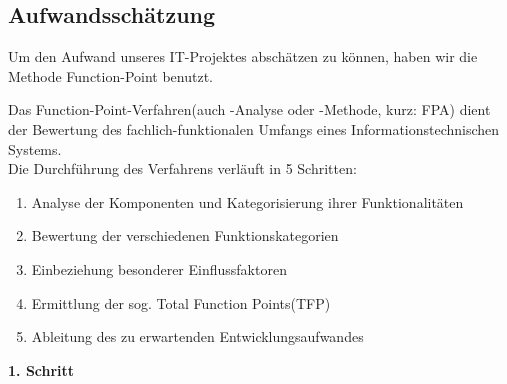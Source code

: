 \subsection{Aufwandsschätzung}
Um den Aufwand unseres IT-Projektes abschätzen zu können, haben wir die Methode Function-Point benutzt.

Das Function-Point-Verfahren(auch -Analyse oder -Methode, kurz: FPA) dient der Bewertung des fachlich-funktionalen Umfangs eines Informationstechnischen Systems.\\
\newline
Die Durchführung des Verfahrens verläuft in 5 Schritten:
\begin{enumerate}
	\item Analyse der Komponenten und Kategorisierung ihrer Funktionalitäten
	\item Bewertung der verschiedenen Funktionskategorien
	\item Einbeziehung besonderer Einflussfaktoren
	\item Ermittlung der sog. Total Function Points(TFP)
	\item Ableitung des zu erwartenden Entwicklungsaufwandes\\
\end{enumerate}
\textbf{1. Schritt}\\

